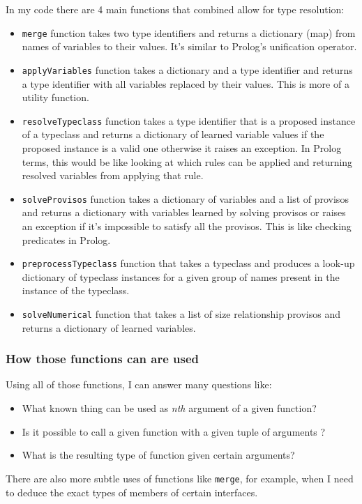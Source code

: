 \documentclass[12pt]{report}
\begin{document}
\par
In my code there are 4 main functions that combined allow for type resolution:
\begin{itemize}
    \item \verb!merge! function takes two type identifiers and returns a dictionary (map) from names of variables to their values. It's similar to Prolog's unification operator.
    \item \verb!applyVariables! function takes a dictionary and a type identifier and returns a type identifier with all variables replaced by their values. This is more of a utility function.
    \item \verb!resolveTypeclass! function takes a type identifier that is a proposed instance of a typeclass and returns a dictionary of learned variable values if the proposed instance is a valid one otherwise it raises an exception. In Prolog terms, this would be like looking at which rules can be applied and returning resolved variables from applying that rule.
    \item \verb!solveProvisos! function takes a dictionary of variables and a list of provisos and returns a dictionary with variables learned by solving provisos or raises an exception if it's impossible to satisfy all the provisos. This is like checking predicates in Prolog.
    \item \verb!preprocessTypeclass! function that takes a typeclass and produces a look-up dictionary of typeclass instances for a given group of names present in the instance of the typeclass.
    \item \verb!solveNumerical! function that takes a list of size relationship provisos and returns a dictionary of learned variables.
\end{itemize}
\subsubsection{How those functions can are used}
Using all of those functions, I can answer many questions like:
\begin{itemize}
    \item What known thing can be used as \emph{nth} argument of a given function?
    \item Is it possible to call a given function with a given tuple of arguments ?
    \item What is the resulting type of function given certain arguments?
\end{itemize}
There are also more subtle uses of functions like \verb!merge!, for example, when I need to deduce the exact types of members of certain interfaces.
\end{document}
